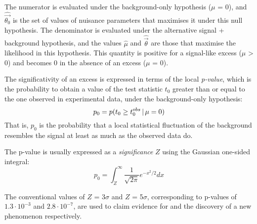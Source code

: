 The numerator is evaluated under the background-only hypothesis ($\mu$ = 0), and $\widehat{\vec{\theta_0}}$ is the set of values of nuisance parameters that maximises it under this null hypothesis.
The denominator is evaluated under the alternative signal + background hypothesis, and the values $\hat{\mu}$ and $\hat{\vec{\theta}}$ are those that maximise the likelihood in this hypothesis.
This quantity is positive for a signal-like excess ($\mu$ > 0) and becomes 0 in the absence of an excess ($\mu$ = 0).

The significativity of an excess is expressed in terms of the local \textit{p-value}, which is the probability to obtain a value of the test statistic $t_0$ greater than or equal to the one observed in experimental data, under the background-only hypothesis:
\begin{equation}
  \label{eq:pvalue}
  p_0 = p(t_0 \ge t_0^{obs}\, |\, \mu = 0)
\end{equation}
That is, $p_0$ is the probability that a local statistical fluctuation of the background resembles the signal at least as much as the observed data do.

The p-value is usually expressed as a \textit{significance} $Z$ using the Gaussian one-sided integral:
\begin{equation}
  \label{eq:significance}
  p_0 = \int_Z^\infty \frac{1}{\sqrt{2\pi}}e^{-x^2/2}dx
\end{equation}

The conventional values of $Z$ = 3$\sigma$ and $Z$ = 5$\sigma$, corresponding to p-values of $1.3 \cdot 10^{-3}$ and $2.8 \cdot 10^{-7}$, are used to claim evidence for and the discovery of a new phenomenon respectively.

